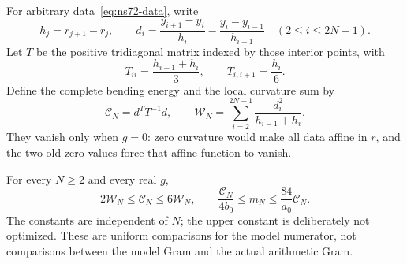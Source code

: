 For arbitrary data~\eqref{eq:ns72-data}, write
\[
 h_j=r_{j+1}-r_j,\qquad
 d_i=\frac{y_{i+1}-y_i}{h_i}-\frac{y_i-y_{i-1}}{h_{i-1}}
       \quad(2\leq i\leq2N-1).
\]
Let $T$ be the positive tridiagonal matrix indexed by those interior
points, with
\[
 T_{ii}=\frac{h_{i-1}+h_i}{3},\qquad T_{i,i+1}=\frac{h_i}{6}.
\]
Define the complete bending energy and the local curvature sum by
\[
 \mathcal C_N=d^TT^{-1}d,\qquad
 \mathcal W_N=\sum_{i=2}^{2N-1}\frac{d_i^2}{h_{i-1}+h_i}.
\]
They vanish only when $g=0$: zero curvature would make all data affine
in $r$, and the two old zero values force that affine function to vanish.

\begin{proposition}
\label{prop:ns72-curvature}
For every $N\geq2$ and every real $g$,
\begin{equation}
 2\mathcal W_N\leq\mathcal C_N\leq6\mathcal W_N,
 \qquad
 \frac{\mathcal C_N}{4b_0}\leq m_N
                         \leq\frac{84}{a_0}\mathcal C_N.
 \label{eq:ns72-curvature-comparison}
\end{equation}
The constants are independent of $N$; the upper constant is deliberately
not optimized. These are uniform comparisons for the model numerator,
not comparisons between the model Gram and the actual arithmetic Gram.
\end{proposition}
